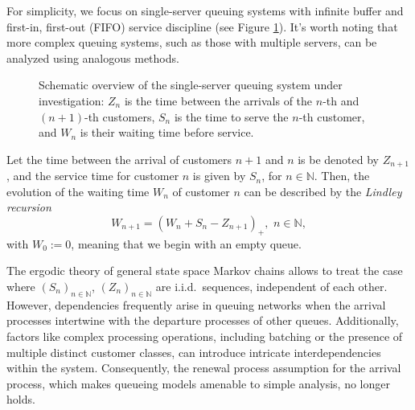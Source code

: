 \documentclass[a4paper,10pt]{article}
\newcommand{\N}{\mathbb{N}}
\begin{document}
\smallskip
For simplicity, we focus on single-server queuing systems with infinite buffer and first-in, first-out (FIFO) service discipline (see Figure \ref{fig:queue}).  It's worth noting that more complex queuing systems, such as those with multiple servers, can be analyzed using analogous methods.
\begin{figure}[!h]
	\centering
	\caption{Schematic overview of the single-server queuing system under investigation: $Z_n$ is the time between the arrivals of the $n$-th and $(n+1)$-th customers, $S_n$ is the time to serve the $n$-th customer, and $W_n$ is their waiting time before service.}
	\label{fig:queue}
\end{figure}
Let the time between the arrival of customers $n+1$ and $n$ is be denoted by $Z_{n+1}$, and the service time for customer $n$ is given by $S_n$, for $n\in\N$. Then, the evolution of the waiting time $W_n$ of customer $n$ can be described by the \emph{Lindley recursion} 
\begin{equation}\label{eq:Lindley}
W_{n+1}=(W_n+S_{n}-Z_{n+1})_+,\,\, n\in\N,
\end{equation}
with $W_0:=0$, meaning that we begin with an empty queue.

\smallskip
The ergodic theory of general state space Markov chains allows to treat the case where $(S_n)_{n\in\N}$, $(Z_n)_{n\in\N}$ are i.i.d.\ sequences, independent of each other. 
However, dependencies frequently arise in queuing networks when the arrival processes intertwine with the departure processes of other queues. Additionally, factors like complex processing operations, including batching or the presence of multiple distinct customer classes, can introduce intricate interdependencies within the system. Consequently, the renewal process assumption for the arrival process, which makes queueing models amenable to simple analysis, no longer holds. 
\end{document}
